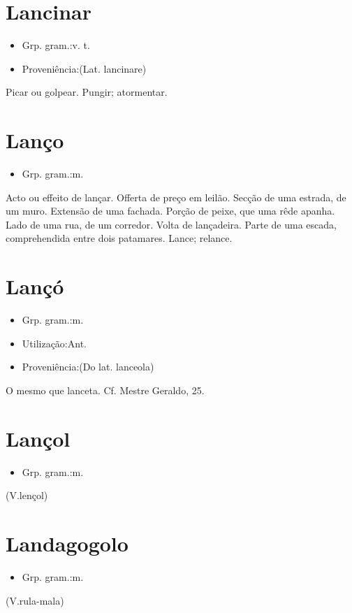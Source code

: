 \section{Lancinar}
\begin{itemize}
\item {Grp. gram.:v. t.}
\end{itemize}
\begin{itemize}
\item {Proveniência:(Lat. \textunderscore lancinare\textunderscore )}
\end{itemize}
Picar ou golpear.
Pungir; atormentar.
\section{Lanço}
\begin{itemize}
\item {Grp. gram.:m.}
\end{itemize}
Acto ou effeito de lançar.
Offerta de preço em leilão.
Secção de uma estrada, de um muro.
Extensão de uma fachada.
Porção de peixe, que uma rêde apanha.
Lado de uma rua, de um corredor.
Volta de lançadeira.
Parte de uma escada, comprehendida entre dois patamares.
Lance; relance.
\section{Lançó}
\begin{itemize}
\item {Grp. gram.:m.}
\end{itemize}
\begin{itemize}
\item {Utilização:Ant.}
\end{itemize}
\begin{itemize}
\item {Proveniência:(Do lat. \textunderscore lanceola\textunderscore )}
\end{itemize}
O mesmo que \textunderscore lanceta\textunderscore . Cf. Mestre Geraldo, 25.
\section{Lançol}
\begin{itemize}
\item {Grp. gram.:m.}
\end{itemize}
(V.lençol)
\section{Landagogolo}
\begin{itemize}
\item {Grp. gram.:m.}
\end{itemize}
(V.rula-mala)

